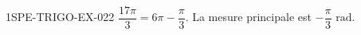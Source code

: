 \begin{corrige}{1SPE-TRIGO-EX-022}
$\dfrac{17\pi}{3} = 6\pi - \dfrac{\pi}{3}$. La mesure principale est $-\dfrac{\pi}{3}\text{ rad}$.
\end{corrige}

%
%
%
%
